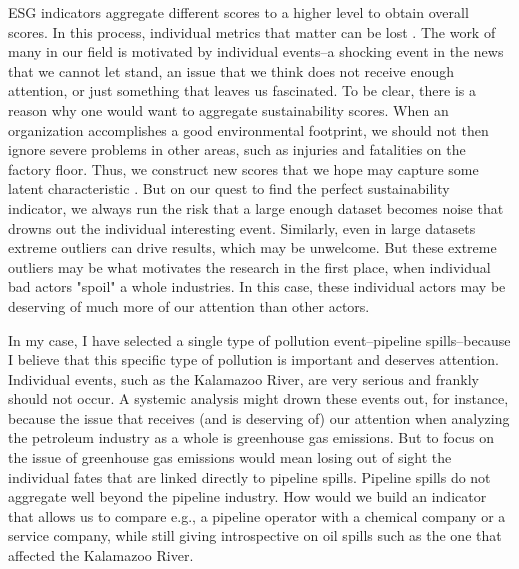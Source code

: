 \documentclass[12pt, man, natbib]{apa6}
\begin{document}
	ESG indicators aggregate different scores to a higher level to obtain overall scores. In this process, individual metrics that matter can be lost \citep{Kotsantonis2019}. The work of many in our field is motivated by individual events--a shocking event in the news that we cannot let stand, an issue that we think does not receive enough attention, or just something that leaves us fascinated. To be clear, there is a reason why one would want to aggregate sustainability scores. When an organization accomplishes a good environmental footprint, we should not then ignore severe problems in other areas, such as injuries and fatalities on the factory floor. Thus, we construct new scores that we hope may capture some latent characteristic \citep{Eccles2019}. But on our quest to find the perfect sustainability indicator, we always run the risk that a large enough dataset becomes noise that drowns out the individual interesting event. Similarly, even in large datasets extreme outliers can drive results, which may be unwelcome. But these extreme outliers may be what motivates the research in the first place, when individual bad actors "spoil" a whole industries. In this case, these individual actors may be deserving of much more of our attention than other actors.
	
	In my case, I have selected a single type of pollution event--pipeline spills--because I believe that this specific type of pollution is important and deserves attention. Individual events, such as the Kalamazoo River, are very serious and frankly should not occur. A systemic analysis might drown these events out, for instance, because the issue that receives (and is deserving of) our attention when analyzing the petroleum industry as a whole is greenhouse gas emissions. But to focus on the issue of greenhouse gas emissions would mean losing out of sight the individual fates that are linked directly to pipeline spills. Pipeline spills do not aggregate well beyond the pipeline industry. How would we build an indicator that allows us to compare e.g., a pipeline operator with a chemical company or a service company, while still giving introspective on oil spills such as the one that affected the Kalamazoo River.
	
\end{document}
